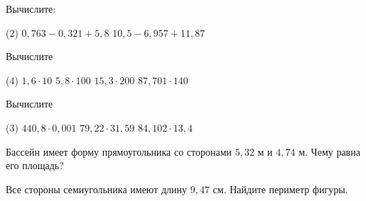\begin{homework}[number=1]
	\begin{listofex}
		\item Вычислите:
		\begin{tasks}(2)
			\task \( 0,763-0,321+5,8 \)
			\task \( 10,5-6,957+11,87 \)
		\end{tasks}
		\item Вычислите 
		\begin{tasks}(4)
			\task \( 1,6\cdot10 \)
			\task \( 5,8\cdot100 \)
			\task \( 15,3\cdot200 \)
			\task \( 87,701\cdot 140 \)
		\end{tasks}
	\item Вычислите 
	\begin{tasks}(3)
		\task \( 440,8\cdot0,001 \)
		\task \( 79,22\cdot31,59 \)
		\task \( 84,102\cdot13,4 \)
	\end{tasks}
		\item Бассейн имеет форму прямоугольника со сторонами \( 5,32 \) м и \( 4,74 \) м. Чему равна его площадь?
		\item Все стороны семиугольника имеют длину \( 9,47 \) см. Найдите периметр фигуры.
	\end{listofex}
\end{homework}

